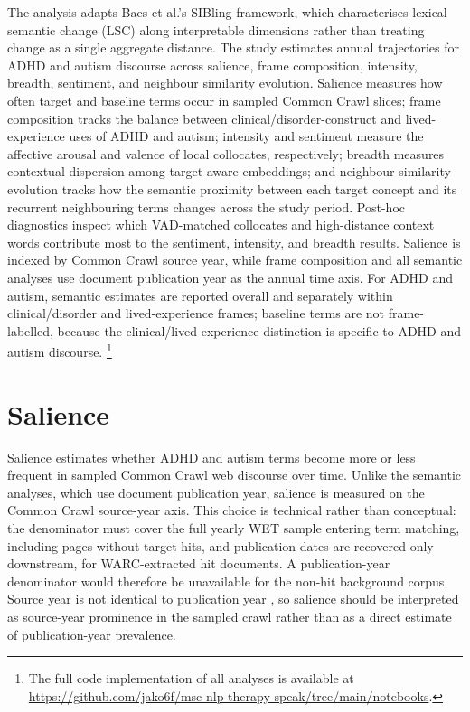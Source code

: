 The analysis adapts Baes et al.'s \citeyear{baesMultidimensionalFrameworkEvaluating2024} SIBling framework, which characterises lexical semantic change (LSC) along interpretable dimensions rather than treating change as a single aggregate distance. The study estimates annual trajectories for ADHD and autism discourse across salience, frame composition, intensity, breadth, sentiment, and neighbour similarity evolution. Salience measures how often target and baseline terms occur in sampled Common Crawl slices; frame composition tracks the balance between clinical/disorder-construct and lived-experience uses of ADHD and autism; intensity and sentiment measure the affective arousal and valence of local collocates, respectively; breadth measures contextual dispersion among target-aware embeddings; and neighbour similarity evolution tracks how the semantic proximity between each target concept and its recurrent neighbouring terms changes across the study period. Post-hoc diagnostics inspect which VAD-matched collocates and high-distance context words contribute most to the sentiment, intensity, and breadth results. Salience is indexed by Common Crawl source year, while frame composition and all semantic analyses use document publication year as the annual time axis. For ADHD and autism, semantic estimates are reported overall and separately within clinical/disorder and lived-experience frames; baseline terms are not frame-labelled, because the clinical/lived-experience distinction is specific to ADHD and autism discourse. \footnote{The full code implementation of all analyses is available at \url{https://github.com/jako6f/msc-nlp-therapy-speak/tree/main/notebooks}.}

\section{Salience}

Salience estimates whether ADHD and autism terms become more or less frequent in sampled Common Crawl web discourse over time. Unlike the semantic analyses, which use document publication year, salience is measured on the Common Crawl source-year axis. This choice is technical rather than conceptual: the denominator must cover the full yearly WET sample entering term matching, including pages without target hits, and publication dates are recovered only downstream, for WARC-extracted hit documents. A publication-year denominator would therefore be unavailable for the non-hit background corpus. Source year is not identical to publication year \citep{baackCriticalAnalysisLargest2024}, so salience should be interpreted as source-year prominence in the sampled crawl rather than as a direct estimate of publication-year prevalence.

